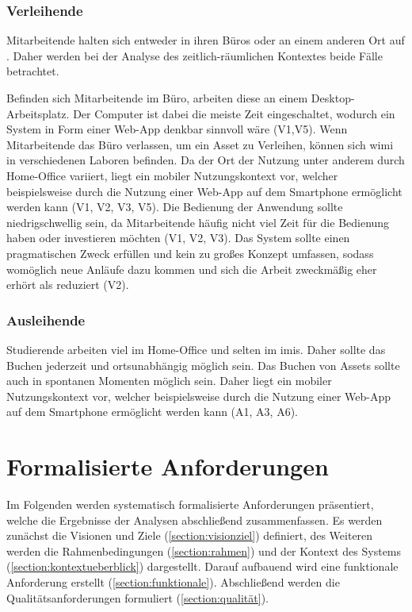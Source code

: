 \subsubsection{Verleihende}
Mitarbeitende halten sich entweder in ihren Büros oder an einem anderen Ort auf . Daher werden bei der Analyse des zeitlich-räumlichen
Kontextes beide Fälle betrachtet.

Befinden sich Mitarbeitende im Büro, arbeiten diese an einem Desktop-Arbeitsplatz. Der Computer ist
dabei die meiste Zeit eingeschaltet, wodurch ein System in Form einer Web-App denkbar sinnvoll wäre
(V1,V5). Wenn Mitarbeitende das Büro verlassen, um ein Asset zu Verleihen, können sich \ac{wimi} in
verschiedenen Laboren befinden. Da der Ort der Nutzung unter anderem durch Home-Office variiert,
liegt ein mobiler Nutzungskontext vor, welcher beispielsweise durch die Nutzung einer Web-App auf
dem Smartphone ermöglicht werden kann (V1, V2, V3, V5). Die Bedienung der Anwendung sollte
niedrigschwellig sein, da Mitarbeitende häufig nicht viel Zeit für die Bedienung haben oder
investieren möchten (V1, V2, V3). Das System sollte einen pragmatischen Zweck erfüllen und kein zu
großes Konzept umfassen, sodass womöglich neue Anläufe dazu kommen und sich die Arbeit zweckmäßig
eher erhört als reduziert (V2).


\subsubsection{Ausleihende}
Studierende arbeiten viel im Home-Office und selten im \ac{imis}. Daher sollte das Buchen jederzeit
und ortsunabhängig möglich sein. Das Buchen von Assets sollte auch in spontanen Momenten möglich
sein. Daher liegt ein mobiler Nutzungskontext vor, welcher beispielsweise durch die Nutzung einer
Web-App auf dem Smartphone ermöglicht werden kann (A1, A3, A6).


\section{Formalisierte Anforderungen}
\label{section:anforderung}

Im Folgenden werden systematisch formalisierte Anforderungen präsentiert, welche die Ergebnisse der
Analysen abschließend zusammenfassen. Es werden zunächst die Visionen und Ziele
(\ref{section:visionziel}) definiert, des Weiteren werden die Rahmenbedingungen
(\ref{section:rahmen}) und der Kontext des Systems (\ref{section:kontextueberblick}) dargestellt.
Darauf aufbauend wird eine funktionale Anforderung erstellt (\ref{section:funktionale}).
Abschließend werden die Qualitätsanforderungen formuliert (\ref{section:qualität}).


